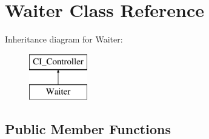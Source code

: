 \hypertarget{class_waiter}{}\section{Waiter Class Reference}
\label{class_waiter}
Inheritance diagram for Waiter\+:\begin{figure}[H]
\begin{center}
\leavevmode
\includegraphics[height=2.000000cm]{class_waiter}
\end{center}
\end{figure}
\subsection*{Public Member Functions}
